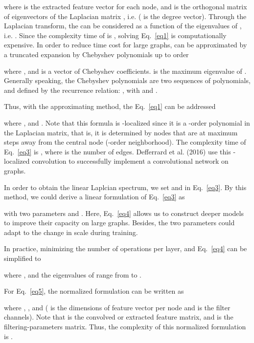 \documentclass[runningheads]{llncs}
\begin{document}
where  is the extracted feature vector for each node, and  is the orthogonal matrix of eigenvectors of the Laplacian matrix , i.e.  ( is the degree vector).  Through the Laplacian transform, the  can be considered as a function of the eigenvalues of , i.e. . Since the complexity time of  is , solving Eq.~\ref{eq1} is computationally expensive. In order to reduce time cost for large graphs,  can be approximated by a truncated expansion by Chebyshev polynomials  up to  order \cite{yan2018spatial}

where , and  is a vector of Chebyshev coefficients.  is the maximum eigenvalue of . Generally speaking, the Chebyshev polynomials are two sequences of polynomials, and defined by the recurrence relation: , with  and .

Thus, with the approximating method, the Eq.~\ref{eq1} can be addressed

where , and . Note that this formula is -localized since it is a -order polynomial in the Laplacian matrix, that is, it is determined by nodes that are at maximum  steps away from the central node (-order neighborhood). The complexity time of Eq.~\ref{eq3} is , where  is the number of edges. Defferrard et al. (2016) use this -localized convolution to successfully implement a convolutional network on graphs. 

In order to obtain the linear Laplcian spectrum, we set  and  in Eq.~\ref{eq3}. By this method, we could derive a linear formulation of Eq.~\ref{eq3} as

with two parameters  and . Here, Eq.~\ref{eq4} allows us to construct deeper models to improve their capacity on large graphs. Besides, the two parameters could adapt to the change in scale during training.

In practice, minimizing the number of operations per layer, and Eq.~\ref{eq4} can be simplified to

where , and the eigenvalues of  range from  to . 

For Eq.~\ref{eq5}, the normalized formulation can be written as

where , ,  and  ( is the dimensions of feature vector per node and  is the filter channels). Note that  is the convolved or extracted feature matrix, and  is the filtering-parameters matrix.  Thus, the complexity of this normalized formulation is . 
\end{document}
